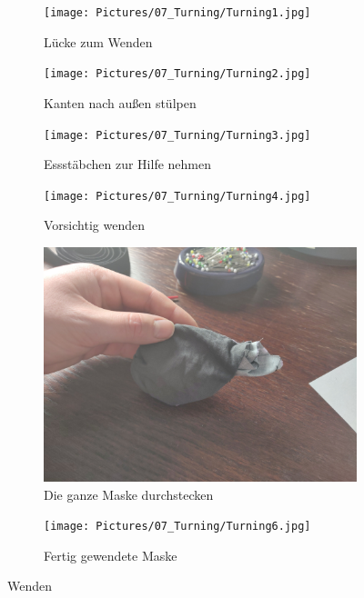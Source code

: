\documentclass[12pt,parskip=full]{scrartcl}
\begin{document}
\begin{figure}[ht]
    \vspace{0.5cm}
    \centering
    \begin{subfigure}{0.48\textwidth}
        \centering
        \texttt{[image: Pictures/07\_Turning/Turning1.jpg]}
        \caption{Lücke zum Wenden}
        \label{Turning1}
    \end{subfigure}
    \begin{subfigure}{0.48\textwidth}
        \centering
        \texttt{[image: Pictures/07\_Turning/Turning2.jpg]}
        \caption{Kanten nach außen stülpen}
        \label{Turning2}
    \end{subfigure}
    \begin{subfigure}{0.48\textwidth}
        \centering
        \texttt{[image: Pictures/07\_Turning/Turning3.jpg]}
        \caption{Essstäbchen zur Hilfe nehmen}
        \label{Turning3}
    \end{subfigure}
    \begin{subfigure}{0.48\textwidth}
        \centering
        \texttt{[image: Pictures/07\_Turning/Turning4.jpg]}
        \caption{Vorsichtig wenden}
        \label{Turning4}
    \end{subfigure}
    \begin{subfigure}{0.48\textwidth}
        \centering
        \includegraphics[width = \linewidth]{Pictures/07_Turning/Turning5.jpg}
        \caption{Die ganze Maske durchstecken}
        \label{Turning5}
    \end{subfigure}
    \begin{subfigure}{0.48\textwidth}
        \centering
        \texttt{[image: Pictures/07\_Turning/Turning6.jpg]}
        \caption{Fertig gewendete Maske}
        \label{Turning6}
    \end{subfigure}
    \caption{Wenden}
    \label{Turning}
\end{figure}
\end{document}
